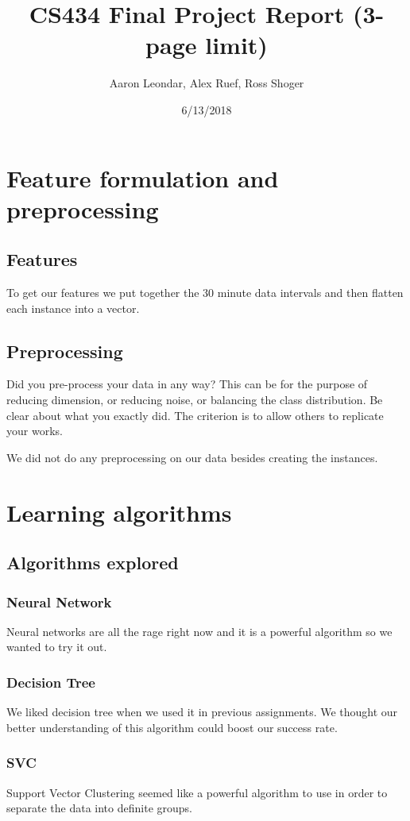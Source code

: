 \documentclass[11pt,a4paper]{article}
\title{CS434 Final Project Report (3-page limit)}
\author{Aaron Leondar, Alex Ruef, Ross Shoger}
\date{6/13/2018}
\begin{document}
\maketitle
\section{Feature formulation and preprocessing}
	\subsection{Features}
	To get our features we put together the 30 minute data intervals and then flatten each instance into a vector.

	\subsection{Preprocessing}
		Did you pre-process your data in any way?
		This can be for the purpose of reducing dimension, or reducing noise, or balancing the class distribution.
		Be clear about what you exactly did.
		The criterion is to allow others to replicate your works.

		We did not do any preprocessing on our data besides creating the instances.

\section{Learning algorithms}
	\subsection{Algorithms explored}
		\subsubsection{Neural Network}
			Neural networks are all the rage right now and it is a powerful algorithm so we wanted to try it out.

		\subsubsection{Decision Tree}
			We liked decision tree when we used it in previous assignments.
			We thought our better understanding of this algorithm could boost our success rate.

		\subsubsection{SVC}
			Support Vector Clustering seemed like a powerful algorithm to use in order to separate the data into definite groups.
\end{document}

